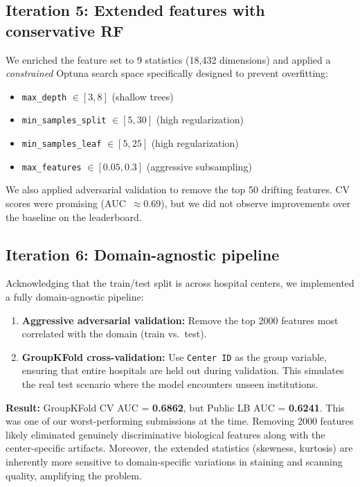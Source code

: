 \documentclass[11pt,a4paper]{article}
\begin{document}
\subsection{Iteration 5: Extended features with conservative RF}

We enriched the feature set to 9 statistics (18,432 dimensions) and applied a \emph{constrained} Optuna search space specifically designed to prevent overfitting:

\begin{itemize}[nosep]
    \item \texttt{max\_depth} $\in [3, 8]$ (shallow trees)
    \item \texttt{min\_samples\_split} $\in [5, 30]$ (high regularization)
    \item \texttt{min\_samples\_leaf} $\in [5, 25]$ (high regularization)
    \item \texttt{max\_features} $\in [0.05, 0.3]$ (aggressive subsampling)
\end{itemize}

We also applied adversarial validation to remove the top 50 drifting features. CV scores were promising (AUC~$\approx 0.69$), but we did not observe improvements over the baseline on the leaderboard.

\subsection{Iteration 6: Domain-agnostic pipeline}
\label{sec:domain}

Acknowledging that the train/test split is across hospital centers, we implemented a fully domain-agnostic pipeline:

\begin{enumerate}[nosep]
    \item \textbf{Aggressive adversarial validation:} Remove the top 2000 features most correlated with the domain (train vs.\ test).
    \item \textbf{GroupKFold cross-validation:} Use \texttt{Center~ID} as the group variable, ensuring that entire hospitals are held out during validation. This simulates the real test scenario where the model encounters unseen institutions.
\end{enumerate}

\textbf{Result:} GroupKFold CV AUC = \textbf{0.6862}, but Public LB AUC = \textbf{0.6241}. This was one of our worst-performing submissions at the time. Removing 2000 features likely eliminated genuinely discriminative biological features along with the center-specific artifacts. Moreover, the extended statistics (skewness, kurtosis) are inherently more sensitive to domain-specific variations in staining and scanning quality, amplifying the problem.
\end{document}
